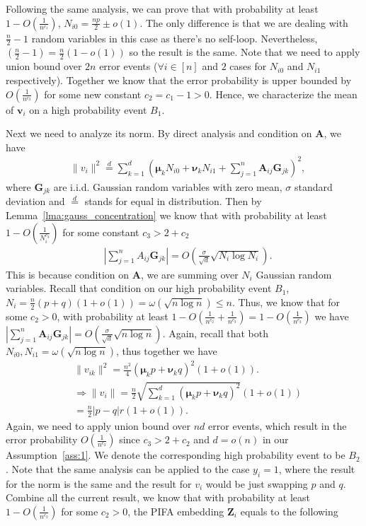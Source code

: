 \documentclass{article} \usepackage{iclr2022_conference,times}
\begin{document}
Following the same analysis, we can prove that with probability at least $1-O(\frac{1}{n^{c_1}})$, $N_{i0}=\frac{np}{2}\pm o(1)$. The only difference is that we are dealing with $\frac{n}{2}-1$ random variables in this case as there's no self-loop. Nevertheless, $(\frac{n}{2}-1)= \frac{n}{2}(1-o(1))$ so the result is the same. Note that we need to apply union bound over $2n$ error events ($\forall i\in [n]$ and $2$ cases for $N_{i0}$ and $N_{i1}$ respectively). Together we know that the error probability is upper bounded by $O(\frac{1}{n^{c_2}})$ for some new constant $c_2=c_1-1>0$. Hence, we characterize the mean of $\mathbf{v}_i$ on a high probability event $B_1$.

Next we need to analyze its norm. By direct analysis and condition on $\mathbf{A}$, we have
\begin{align}
	& \|v_i\|^2 \stackrel{d}{=} \sum_{k=1}^d(\boldsymbol{\mu}_k N_{i0} + \boldsymbol{\nu}_k N_{i1} + \sum_{j=1}^{n}\mathbf{A}_{ij}\mathbf{G}_{jk})^2,
\end{align}
where $\mathbf{G}_{jk}$ are i.i.d. Gaussian random variables with zero mean, $\sigma$ standard deviation and $\stackrel{d}{=}$ stands for equal in distribution. Then by Lemma~\ref{lma:gauss_concentration} we know that with probability at least $1-O(\frac{1}{N_{i}^{c_3}})$ for some constant $c_3>2+c_2$
\begin{align}
	& |\sum_{j=1}^{n}A_{ij}\mathbf{G}_{jk}| = O(\frac{\sigma}{\sqrt{d}}\sqrt{N_{i}\log N_{i}}).
\end{align}
This is because condition on $\mathbf{A}$, we are summing over $N_i$ Gaussian random variables. Recall that condition on our high probability event $B_1$, $N_{i} = \frac{n}{2}(p+q)(1+o(1)) = \omega(\sqrt{n\log n}) \leq n$. Thus, we know that for some $c_2>0$, with probability at least $1-O(\frac{1}{n^{c_2}}+\frac{1}{n^{c_3}})=1-O(\frac{1}{n^{c_2}})$ we have $|\sum_{j=1}^{n}\mathbf{A}_{ij}\mathbf{G}_{jk}| = O(\frac{\sigma}{\sqrt{d}}\sqrt{n\log n})$.  Again, recall that both $N_{i0},N_{i1} = \omega(\sqrt{n\log n})$, thus together we have
\begin{align}
	& \|v_{ik}\|^2 = \frac{n^2}{4}(\boldsymbol{\mu}_kp+\boldsymbol{\nu}_kq)^2(1+o(1)).\\
	& \Rightarrow \|v_{i}\| = \frac{n}{2}\sqrt{\sum_{k=1}^d(\boldsymbol{\mu}_kp+\boldsymbol{\nu}_kq)^2}(1+o(1))\\
	& = \frac{n}{2}|p-q|r(1+o(1)).
\end{align}
Again, we need to apply union bound over $nd$ error events, which result in the error probability $O(\frac{1}{n^{c_2}})$ since $c_3>2+c_2$ and $d=o(n)$ in our Assumption~\ref{ass:1}. We denote the corresponding high probability event to be $B_2$. Note that the same analysis can be applied to the case $y_i=1$, where the result for the norm is the same and the result for $v_i$ would be just swapping $p$ and $q$. Combine all the current result, we know that with probability at least $1-O(\frac{1}{n^{c_2}})$ for some $c_2>0$, the PIFA embedding $\mathbf{Z}_i$ equals to the following
\end{document}
